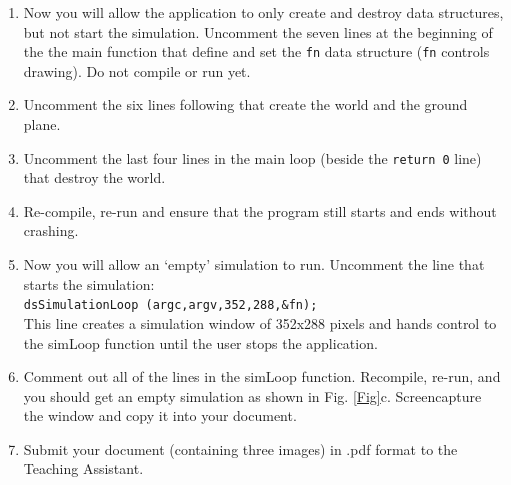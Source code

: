 \documentclass[12pt]{article}
\begin{document}
\begin{enumerate}
\item Now you will allow the application to only create and destroy data structures, but not start the simulation. Uncomment the seven lines at the beginning of the the main function that define and set the \texttt{fn} data structure (\texttt{fn} controls drawing). Do not compile or run yet.

\item Uncomment the six lines following that create the world and the ground plane.

\item Uncomment the last four lines in the main loop (beside the \texttt{return 0} line) that destroy the world.

\item Re-compile, re-run and ensure that the program still starts and ends without crashing.

\item Now you will allow an `empty' simulation to run. Uncomment the line that starts the simulation:\\
\texttt{dsSimulationLoop (argc,argv,352,288,\&fn);}\\
This line creates a simulation window of 352x288 pixels and hands control to the simLoop function until the user stops the application.

\item Comment out all of the lines in the simLoop function. Recompile, re-run, and you should get an empty simulation as shown in Fig. \ref{Fig}c. Screencapture the window and copy it into your document.

\item Submit your document (containing three images) in .pdf format to the Teaching Assistant.

\end{enumerate}
\end{document}
